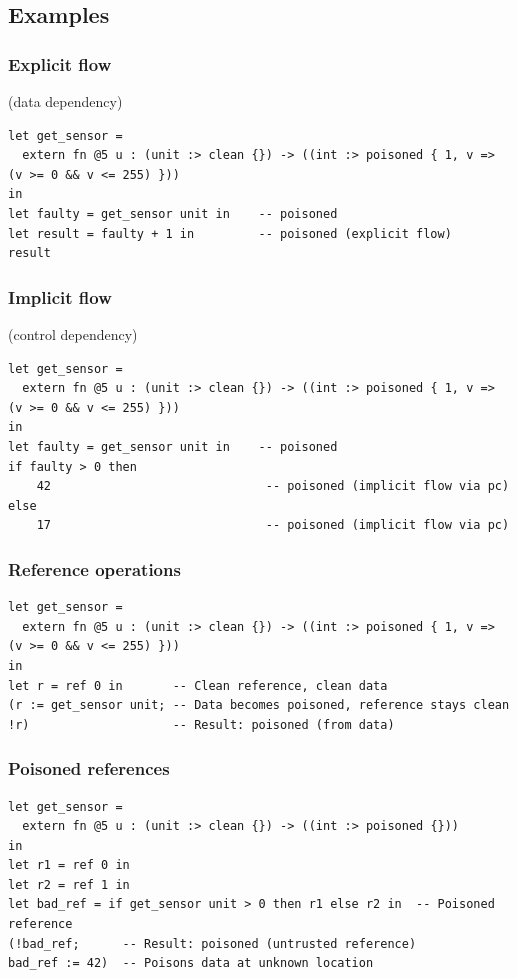 \documentclass[12pt]{article}
\begin{document}
\subsection{Examples}

\subsubsection*{Explicit flow} (data dependency)
\begin{lstlisting}[language=poison]
let get_sensor =
  extern fn @5 u : (unit :> clean {}) -> ((int :> poisoned { 1, v => (v >= 0 && v <= 255) }))
in
let faulty = get_sensor unit in    -- poisoned
let result = faulty + 1 in         -- poisoned (explicit flow)
result
\end{lstlisting}

\subsubsection*{Implicit flow} (control dependency)
\begin{lstlisting}[language=poison]
let get_sensor =
  extern fn @5 u : (unit :> clean {}) -> ((int :> poisoned { 1, v => (v >= 0 && v <= 255) }))
in
let faulty = get_sensor unit in    -- poisoned
if faulty > 0 then
    42                              -- poisoned (implicit flow via pc)
else
    17                              -- poisoned (implicit flow via pc)
\end{lstlisting}

\subsubsection*{Reference operations}
\begin{lstlisting}[language=poison]
let get_sensor =
  extern fn @5 u : (unit :> clean {}) -> ((int :> poisoned { 1, v => (v >= 0 && v <= 255) }))
in
let r = ref 0 in       -- Clean reference, clean data
(r := get_sensor unit; -- Data becomes poisoned, reference stays clean
!r)                    -- Result: poisoned (from data)
\end{lstlisting}

\subsubsection*{Poisoned references}
\begin{lstlisting}[language=poison]
let get_sensor =
  extern fn @5 u : (unit :> clean {}) -> ((int :> poisoned {}))
in
let r1 = ref 0 in
let r2 = ref 1 in
let bad_ref = if get_sensor unit > 0 then r1 else r2 in  -- Poisoned reference
(!bad_ref;      -- Result: poisoned (untrusted reference)
bad_ref := 42)  -- Poisons data at unknown location
\end{lstlisting}
\end{document}
